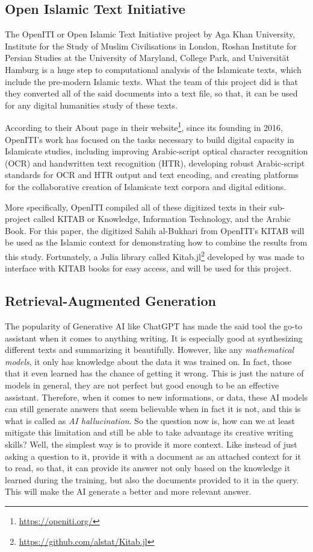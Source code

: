 \subsection{Open Islamic Text Initiative}
The OpenITI or Open Islamic Text Initiative project by Aga Khan University, Institute for the Study of Muslim Civilisations in London, Roshan Institute for Persian Studies at the University of Maryland, College Park, and Universität Hamburg is a huge step to computational analysis of the Islamicate texts, which include the pre-modern Islamic texts. What the team of this project did is that they converted all of the said documents into a text file, so that, it can be used for any digital humanities study of these texts.

According to their About page in their website\footnote{\url{https://openiti.org/}}, since its founding in 2016, OpenITI's work has focused on the tasks necessary to build digital capacity in Islamicate studies, including improving Arabic-script optical character recognition (OCR) and handwritten text recognition (HTR), developing robust Arabic-script standards for OCR and HTR output and text encoding, and creating platforms for the collaborative creation of Islamicate text corpora and digital editions.

More specifically, OpenITI compiled all of these digitized texts in their sub-project called KITAB or Knowledge, Information Technology, and the Arabic Book. For this paper, the digitized Sahih al-Bukhari from  OpenITI's KITAB will be used as the Islamic context for demonstrating how to combine the results from this study. Fortunately, a Julia library called Kitab.jl\footnote{\url{https://github.com/alstat/Kitab.jl}} developed by  was made to interface with KITAB books for easy access, and will be used for this project.
\subsection{Retrieval-Augmented Generation}
The popularity of Generative AI like ChatGPT has made the said tool the go-to assistant when it comes to anything writing. It is especially good at synthesizing different texts and summarizing it beautifully. However, like any \textit{mathematical models}, it only has knowledge about the data it was trained on. In fact, those that it even learned has the chance of getting it wrong. This is just the nature of models in general, they are not perfect but good enough to be an effective assistant. Therefore, when it comes to new informations, or data, these AI models can still generate answers that seem believable when in fact it is not, and this is what is called as \textit{AI hallucination}. So the question now is, how can we at least mitigate this limitation and still be able to take advantage its creative writing skills? Well, the simplest way is to provide it more context. Like instead of just asking a question to it, provide it with a document as an attached context for it to read, so that, it can provide its answer not only based on the knowledge it learned during the training, but also the documents provided to it in the query. This will make the AI generate a better and more relevant answer.


